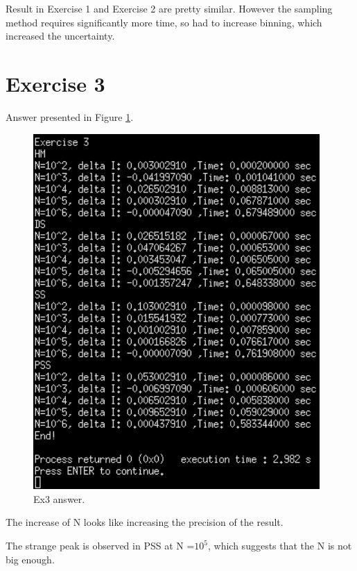 \documentclass{article}
\begin{document}
Result in Exercise 1 and Exercise 2 are pretty similar. However the sampling method requires significantly more time, so had to increase binning, which increased the uncertainty.


\section{Exercise 3}
Answer presented in Figure \ref{fig:ex3_answer}.
\begin{figure}[!hbt]
	\centering
	\includegraphics[width=4.3in]{ex3_answer}
	\caption{Ex3 answer.}
	\label{fig:ex3_answer}
\end{figure}

The increase of N looks like increasing the precision of the result.

The strange peak is observed in PSS at N =$10^5$, which suggests that the N is not big enough.
\end{document}
